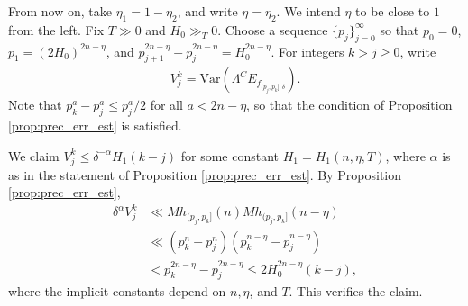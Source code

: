 \documentclass[11pt]{amsart}
\numberwithin{theorem}{section}
\numberwithin{equation}{section}
\theoremstyle{remark}
\theoremstyle{definition}
\begin{document}
From now on, take $\eta_1=1-\eta_2$, and write $\eta = \eta_2$. We intend $\eta$ to be close to $1$ from the left. Fix $T \gg 0$ and $H_0 \gg_T 0$. Choose a sequence $\{p_j\}_{j=0}^\infty$ so that $p_0=0$, $p_1= (2H_0)^{2n-\eta}$, and $p_{j+1}^{2n-\eta} - p_j^{2n-\eta} = H_0^{2n-\eta}$. For integers $k>j\geq0$, write
\begin{align*}
V_j^k = \mathrm{Var}(\Lambda^CE_{f_{(p_j,p_k],\delta}}).
\end{align*}
Note that $p_k^a-p_j^a \leq p_j^a/2$ for all $a < 2n-\eta$, so that the condition of Proposition \ref{prop:prec_err_est} is satisfied.

We claim $V_j^k \leq \delta^{-\alpha}H_1(k-j)$ for some constant $H_1=H_1(n,\eta,T)$, where $\alpha$ is as in the statement of Proposition \ref{prop:prec_err_est}. By Proposition \ref{prop:prec_err_est},
\begin{align*}
\delta^{\alpha}V_j^k &\ll Mh_{(p_j,p_k]}(n)Mh_{(p_j,p_k]}(n-\eta) \\
&\ll (p_k^n-p_j^n)(p_k^{n-\eta}-p_j^{n-\eta}) \\
&< p_k^{2n-\eta}-p_j^{2n-\eta} \leq 2H_0^{2n-\eta}(k-j),
\end{align*}
where the implicit constants depend on $n, \eta$, and $T$.
This verifies the claim.
\end{document}
